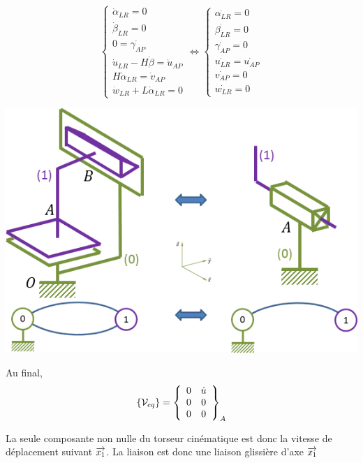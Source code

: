 \documentclass[10pt]{article}
\begin{document}
{\begin{corrige}
\noindent\begin{minipage}[c]{.45\linewidth}
$$
\left\{
\begin{array}{l}
\dot{\alpha}_{LR}=0 \\
\dot{\beta}_{LR}=0 \\
0=\dot{\gamma_{AP}} \\
\dot{u}_{LR}-H\dot{\beta} =\dot{u}_{AP} \\
H\dot{\alpha}_{LR}= \dot{v}_{AP} \\
\dot{w}_{LR}+L\dot{\alpha} _{LR}= 0
\end{array}
\right.
\Longleftrightarrow
\left\{
\begin{array}{l}
\dot{\alpha_{LR}}=0 \\
\dot{\beta_{LR}}=0 \\
\dot{\gamma_{AP}}=0 \\
\dot{u_{LR}} =\dot{u_{AP}} \\
 \dot{v_{AP}} = 0\\
\dot{w_{LR}} = 0
\end{array}
\right.
$$
\end{minipage}\hfill
\begin{minipage}[c]{.5\linewidth}
\begin{center}
\includegraphics[width=\textwidth]{images/cf_eq}
\end{center}
\end{minipage}

Au final, 
$$
\{\mathcal{V}_{eq}\}=
\torseurcol{0}{0}{0}{\dot{u}}{0}{0}{A}
$$

\vspace{.25cm}

La seule composante non nulle du torseur cinématique est donc la vitesse de déplacement suivant $\vect{x_1}$. La liaison est donc une liaison glissière d'axe $\vect{x_1}$



\end{corrige}}
\end{document}
